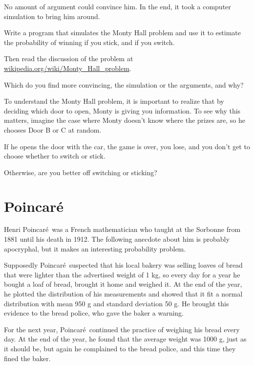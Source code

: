 \documentclass[12pt]{book}
\begin{document}
No amount of argument could convince him.  In the end, it took
a computer simulation to bring him around.

\begin{ex}

Write a program that simulates the Monty Hall problem and use
it to estimate the probability of winning if you stick, and if
you switch.

Then read the discussion of the problem at
\url{wikipedia.org/wiki/Monty_Hall_problem}.

Which do you find more convincing, the simulation or the arguments,
and why?

\end{ex}


\begin{ex}

To understand the Monty Hall problem, it is important to realize
that by deciding which door to open, Monty is giving you information.
To see why this matters, imagine the case where Monty doesn't
know where the prizes are, so he chooses Door B or C at random.

If he opens the door with the car, the game is over, you lose, and
you don't get to choose whether to switch or stick.

Otherwise, are you better off switching or sticking?

\end{ex}



\newcommand{\Poincare}{Poincar\'{e}}

\section{\Poincare}

Henri \Poincare~was a French mathematician who taught at the Sorbonne
from 1881 until his death in 1912.  The following anecdote about him
is probably apocryphal, but it makes an interesting probability
problem.

Supposedly \Poincare~suspected that his local bakery was selling
loaves of bread that were lighter than the advertised weight of 1 kg,
so every day for a year he bought a loaf of bread, brought it home and
weighed it.  At the end of the year, he plotted the distribution of
his measurements and showed that it fit a normal distribution with
mean 950 g and standard deviation 50 g.  He brought this evidence to
the bread police, who gave the baker a warning.

For the next year, \Poincare~continued the practice of weighing his
bread every day.  At the end of the year, he found that the average
weight was 1000 g, just as it should be, but again he complained to
the bread police, and this time they fined the baker.
\end{document}
